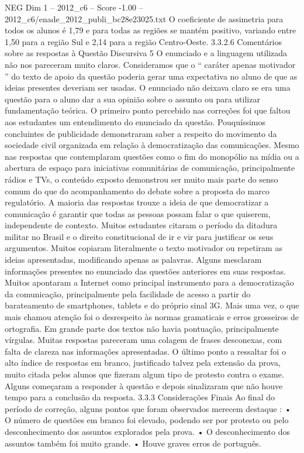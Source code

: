 \begin{textsample}{NEG Dim 1 – 2012\_c6 – Score -1.00 – 2012\_c6/enade\_2012\_publi\_bc28e23025.txt}
O coeficiente de assimetria para todos os alunos é 1,79 e para todas as regiões se mantém positivo, variando entre 1,50 para a região Sul e 2,14 para a região Centro-Oeste. 3.3.2.6 Comentários sobre as respostas à Questão Discursiva 5 O enunciado e a linguagem utilizada não nos pareceram muito claros.
Consideramos que o “ caráter apenas motivador ” do texto de apoio da questão poderia gerar uma expectativa no aluno de que as ideias presentes deveriam ser usadas.
O enunciado não deixava claro se era uma questão para o aluno dar a sua opinião sobre o assunto ou para utilizar fundamentação teórica.
O primeiro ponto percebido nas correções foi que faltou aos estudantes um entendimento do enunciado da questão.
Pouquíssimos concluintes de publicidade demonstraram saber a respeito do movimento da sociedade civil organizada em relação à democratização das comunicações.
Mesmo nas respostas que contemplaram questões como o fim do monopólio na mídia ou a abertura de espaço para iniciativas comunitárias de comunicação, principalmente rádios e TVs, o conteúdo exposto demonstrou ser muito mais parte do senso comum do que do acompanhamento do debate sobre a proposta do marco regulatório.
A maioria das respostas trouxe a ideia de que democratizar a comunicação é garantir que todas as pessoas possam falar o que quiserem, independente de contexto.
Muitos estudantes citaram o período da ditadura militar no Brasil e o direito constitucional de ir e vir para justificar os seus argumentos.
Muitos copiaram literalmente o texto motivador ou repetiram as ideias apresentadas, modificando apenas as palavras.
Alguns mesclaram informações presentes no enunciado das questões anteriores em suas respostas.
Muitos apontaram a Internet como principal instrumento para a democratização da comunicação, principalmente pela facilidade de acesso a partir do barateamento de smartphones, tablets e do próprio sinal 3G.
Mais uma vez, o que mais chamou atenção foi o desrespeito às normas gramaticais e erros grosseiros de ortografia.
Em grande parte dos textos não havia pontuação, principalmente vírgulas.
Muitas respostas pareceram uma colagem de frases desconexas, com falta de clareza nas informações apresentadas.
O último ponto a ressaltar foi o alto índice de respostas em branco, justificado talvez pela extensão da prova, muito citada pelos alunos que fizeram algum tipo de protesto contra o exame.
Alguns começaram a responder à questão e depois sinalizaram que não houve tempo para a conclusão da resposta. 3.3.3 Considerações Finais Ao final do período de correção, alguns pontos que foram observados merecem destaque : • O número de questões em branco foi elevado, podendo ser por protesto ou pelo desconhecimento dos assuntos explorados pela prova. • O desconhecimento dos assuntos também foi muito grande. • Houve graves erros de português.

\end{textsample}
